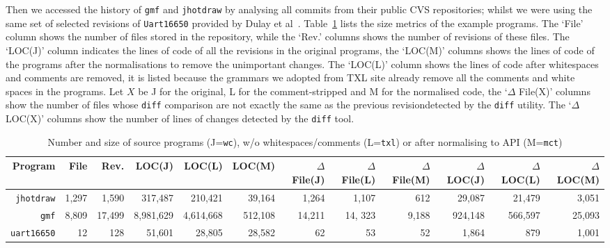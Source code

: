 \documentclass[10pt, conference, compsocconf]{IEEEtran}
\begin{document}
{Then we accessed the history of {\tt gmf} and {\tt jhotdraw} by analysing all commits from their public CVS repositories; whilst we were using the same set of selected revisions of {\tt Uart16650} provided by Dulay et al~\cite{Duley:2010:PDA:1858996.1859093}.
Table~\ref{table:3} lists the size metrics of the example programs. The `File' column shows the number of files stored in the repository, while the `Rev.' columns shows the number of revisions of these files. The `LOC(J)' column indicates the lines of code of all the revisions in the original programs, the `LOC(M)' columns shows the lines of code of the programs after the normalisations to remove the unimportant changes. The `LOC(L)' column shows the lines of code after whitespaces and comments are removed, it is listed because the grammars we adopted from TXL site already remove all the comments and white spaces in the programs.
%
Let $X$ be J for the original, L for the comment-stripped and M for the normalised code, the `$\Delta$ File(X)' columns show the number of files whose {\tt diff} comparison are not exactly the same as the previous revisiondetected by the {\tt diff} utility. The `$\Delta$ LOC(X)' columns show the number of lines of changes detected by the {\tt diff} tool. 
\begin{table}\centering
\caption{Number and size of source programs (J={\tt wc}), w/o whitespaces/comments  (L={\tt txl}) or after normalising to API (M={\tt mct})\label{table:3}}
\begin{tabular}{| r || r | r || r | r | r || r| r|  r || r | r | r |}\hline
{\bf Program} & File & Rev. & LOC(J) & LOC(L) & LOC(M) & $\Delta$ File(J)  & $\Delta$ File(L) & $\Delta$ File(M) & $\Delta$ LOC(J) & $\Delta$ LOC(L) & $\Delta$ LOC(M) \\  \hline\hline
{\tt jhotdraw} & 1,297 & 1,590 & 		317,487& 210,421 & 39,164 & 1,264 & 1,107 & 612 &	29,087 	& 21,479 & 3,051 \\\hline
{\tt gmf} & 8,809 & 17,499 & 8,981,629 & 4,614,668& 512,108& 14,211 &  14, 323& 9,188 & 924,148 & 566,597& 25,093 \\\hline
{\tt uart16650} & 12 & 128 & 51,601 & 28,805 & 28,582 & 62 & 53 & 52 & 1,864 & 879 & 1,001 \\\hline
\hline\end{tabular}
\end{table}

}
\end{document}

